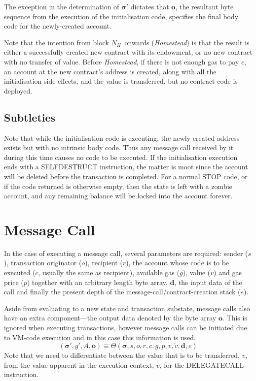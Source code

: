 \documentclass[9pt,oneside]{amsart}
\newcommand{\firsthomesteadblock}{\ensuremath{N_H}}
\begin{document}
\begin{multicols}{2}
The exception in the determination of $\boldsymbol{\sigma}'$ dictates that $\mathbf{o}$, the resultant byte sequence from the execution of the initialisation code, specifies the final body code for the newly-created account.

Note that the intention from block \firsthomesteadblock\ onwards ({\it Homestead}) is that the result is either a successfully created new contract with its endowment, or no new contract with no transfer of value. Before {\it Homestead}, if there is not enough gas to pay $c$, an account at the new contract's address is created, along with all the initialisation side-effects, and the value is transferred, but no contract code is deployed.

\subsection{Subtleties}
Note that while the initialisation code is executing, the newly created address exists but with no intrinsic body code. Thus any message call received by it during this time causes no code to be executed. If the initialisation execution ends with a {\small SELFDESTRUCT} instruction, the matter is moot since the account will be deleted before the transaction is completed. For a normal {\small STOP} code, or if the code returned is otherwise empty, then the state is left with a zombie account, and any remaining balance will be locked into the account forever.

\section{Message Call} \label{ch:call}
In the case of executing a message call, several parameters are required: sender ($s$), transaction originator ($o$), recipient ($r$), the account whose code is to be executed ($c$, usually the same as recipient), available gas ($g$), value ($v$) and gas price ($p$) together with an arbitrary length byte array, $\mathbf{d}$, the input data of the call and finally the present depth of the message-call/contract-creation stack ($e$).

Aside from evaluating to a new state and transaction substate, message calls also have an extra component---the output data denoted by the byte array $\mathbf{o}$. This is ignored when executing transactions, however message calls can be initiated due to VM-code execution and in this case this information is used.
\begin{equation}
(\boldsymbol{\sigma}', g', A, \mathbf{o}) \equiv \Theta(\boldsymbol{\sigma}, s, o, r, c, g, p, v, \tilde{v}, \mathbf{d}, e)
\end{equation}
Note that we need to differentiate between the value that is to be transferred, $v$, from the value apparent in the execution context, $\tilde{v}$, for the {\small DELEGATECALL} instruction.


\end{multicols}
\end{document}
